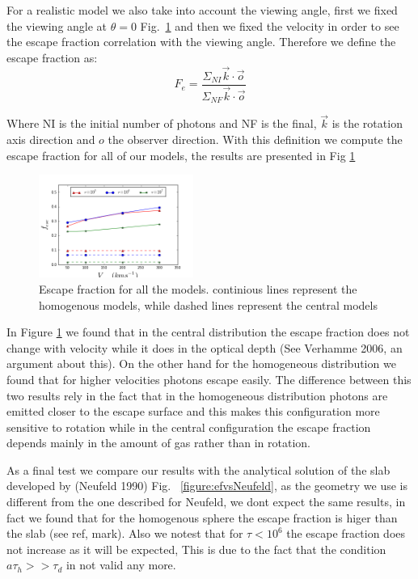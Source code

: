 \documentclass[usenatbib]{mn2e}
\begin{document}
For a realistic model we also take into account the viewing angle, first we fixed 
the viewing angle at $\theta = 0$  Fig.~\ref{figure:efvsv} and then we fixed the 
velocity in order to see the escape fraction correlation with the viewing angle. 
Therefore we define the escape fraction as:\\ 

\begin{equation}
F_{e}=\dfrac{\Sigma_{NI} \vec{k}\cdot \vec{o}}{\Sigma_{NF}\vec{k}\cdot \vec{o}}
\end{equation}

Where NI is the initial number of photons and NF is the final,
$\vec{k}$ is the rotation axis direction and ${o}$ the observer
direction. With this definition we compute the escape fraction for all
of our models, the results are presented in Fig \ref{figure:efvsv}\\  
 
\begin{figure}
  \includegraphics[width=0.45\textwidth]{EscapeFraction.png}
   \caption{Escape fraction for all the models. continious lines represent the homogenous models, while dashed lines represent the central models}\label{figure:efvsv}
\end{figure}

In Figure \ref{figure:efvsv} we found that in the central distribution
the escape fraction does not change with velocity while it does in the
optical depth (See Verhamme 2006, an argument about this). On the other
hand for the homogeneous distribution we
found that for higher velocities photons escape easily. The difference
between this two results rely in the fact that in the homogeneous
distribution photons are emitted closer to the escape surface and this
makes this configuration more sensitive to rotation while in the
central configuration the escape fraction depends mainly in the amount
of gas rather than in rotation. 

As a final test we compare our results with the analytical solution of 
the slab developed by (Neufeld 1990) Fig. ~\ref{figure:efvsNeufeld}, as 
the geometry we use is different from the one described for Neufeld, we 
dont expect the same results, in fact we found that for the homogenous 
sphere the escape fraction is higer than the slab (see ref, mark). Also 
we notest that for $\tau<10^{6}$ the escape fraction does not increase 
as it will be expected, This is due to the fact that the condition 
$a\tau_{h}>>\tau_{d}$ in not valid any more.
\end{document}
